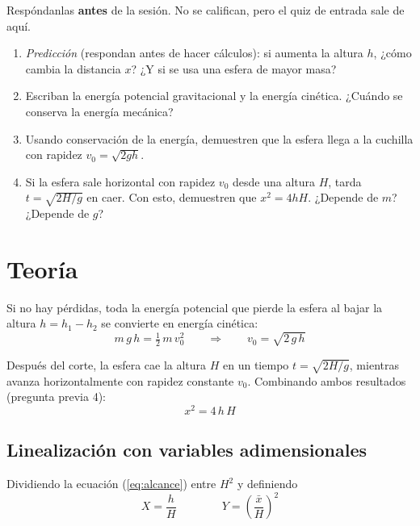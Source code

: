 \documentclass[11pt, letterpaper]{article}
\begin{document}
	Respóndanlas \textbf{antes} de la sesión. No se califican, pero el quiz de
	entrada sale de aquí.
	
	\begin{enumerate}
		\item \emph{Predicción} (respondan antes de hacer cálculos): si aumenta la
		altura $h$, ¿cómo cambia la distancia $x$? ¿Y si se usa una esfera de mayor
		masa?
		
		\item Escriban la energía potencial gravitacional y la energía cinética.
		¿Cuándo se conserva la energía mecánica?
		
		\item Usando conservación de la energía, demuestren que la esfera llega a la
		cuchilla con rapidez $v_0 = \sqrt{2gh}$.
		
		\item Si la esfera sale horizontal con rapidez $v_0$ desde una altura $H$,
		tarda $t = \sqrt{2H/g}$ en caer. Con esto, demuestren que $x^{2} = 4hH$.
		¿Depende de $m$? ¿Depende de $g$?
	\end{enumerate}
	
	\section{Teoría}
	
	Si no hay pérdidas, toda la energía potencial que pierde la esfera al bajar la
	altura $h = h_1 - h_2$ se convierte en energía cinética:
	\begin{equation}
		m\,g\,h = \tfrac{1}{2}\,m\,v_0^{2}
		\qquad\Longrightarrow\qquad
		v_0 = \sqrt{2\,g\,h}
		\label{eq:energia}
	\end{equation}
	
	\noindent
	Después del corte, la esfera cae la altura $H$ en un tiempo $t=\sqrt{2H/g}$,
	mientras avanza horizontalmente con rapidez constante $v_0$. Combinando ambos
	resultados (pregunta previa 4):
	\begin{equation}
		x^{2} = 4\,h\,H
		\label{eq:alcance}
	\end{equation}
	
	\subsection*{Linealización con variables adimensionales}
	
	Dividiendo la ecuación (\ref{eq:alcance}) entre $H^{2}$ y definiendo
	\begin{equation}
		X = \frac{h}{H}
		\qquad\qquad
		Y = \left(\frac{\bar{x}}{H}\right)^{2}
		\label{eq:variables}
	\end{equation}
	
\end{document}
